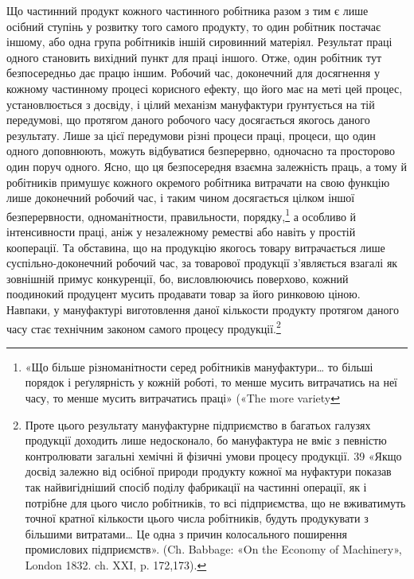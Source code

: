 Що частинний продукт кожного частинного робітника разом
з тим є лише осібний ступінь у розвитку того самого продукту,
то один робітник постачає іншому, або одна група робітників
іншій сировинний матеріял. Результат праці одного становить
вихідний пункт для праці іншого. Отже, один робітник тут безпосередньо
дає працю іншим. Робочий час, доконечний для
досягнення у кожному частинному процесі корисного ефекту,
що його має на меті цей процес, установлюється з досвіду, і цілий
механізм мануфактури ґрунтується на тій передумові, що протягом
даного робочого часу досягається якогось даного результату.
Лише за цієї передумови різні процеси праці, процеси, що
один одного доповнюють, можуть відбуватися безперервно,
одночасно та просторово один поруч одного. Ясно, що ця безпосередня
взаємна залежність праць, а тому й робітників примушує
кожного окремого робітника витрачати на свою функцію лише
доконечний робочий час, і таким чином досягається цілком іншої
безперервности, одноманітности, правильности, порядку,\footnote{
«Що більше різноманітности серед робітників мануфактури\dots{} то
більші порядок і реґулярність у кожній роботі, то менше мусить витрачатись
на неї часу, то менше мусить витрачатись праці» («The more variety
} а особливо
й інтенсивности праці, аніж у незалежному реместві або
навіть у простій кооперації. Та обставина, що на продукцію
якогось товару витрачається лише суспільно-доконечний робочий
час, за товарової продукції з’являється взагалі як зовнішній
примус конкуренції, бо, висловлюючись поверхово, кожний
поодинокий продуцент мусить продавати товар за його ринковою
ціною. Навпаки, у мануфактурі виготовлення даної кількости
продукту протягом даного часу стає технічним законом самого
процесу продукції.\footnote{
Проте цього результату мануфактурне підприємство в багатьох
галузях продукції доходить лише недосконало, бо мануфактура не вміє
з певністю контролювати загальні хемічні й фізичні умови процесу продукції.
39 «Якщо досвід залежно від осібної природи продукту кожної ма
нуфактури показав так найвигідніший спосіб поділу фабрикації на
частинні операції, як і потрібне для цього число робітників, то всі підприємства,
що не вживатимуть точної кратної кількости цього числа
робітників, будуть продукувати з більшими витратами\dots{} Це одна з
причин колосального поширення промислових підприємств». (Ch. Babbage:
«On the Economy of Machinery», London 1832. ch. XXI, p. 172,173).
}

